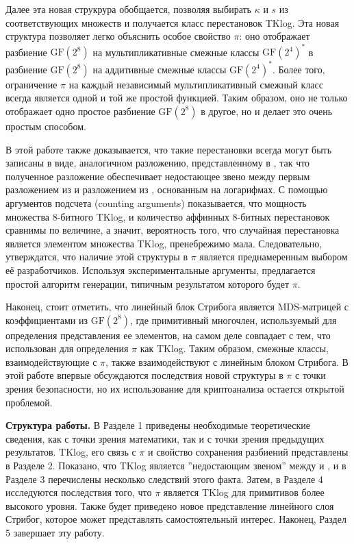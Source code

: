 Далее эта новая струкрура обобщается, позволяя выбирать \(\kappa\) и \(s\) из соответствующих множеств и получается класс перестановок TKlog. Эта новая структура позволяет легко объяснить особое свойство \(\pi\): оно отображает разбиение \(\text{GF}(2^8)\) на мультипликативные смежные классы \(\text{GF}(2^4)^*\) в разбиение \(\text{GF}(2^8)\) на аддитивные смежные классы \(\text{GF}(2^4)^*\). Более того, ограничение \(\pi\) на каждый независимый мультипликативный смежный класс всегда является одной и той же простой функцией. Таким образом, оно не только отображает одно простое разбиение \(\text{GF}(2^8)\) в другое, но и делает это очень простым способом.

В этой работе также доказывается, что такие перестановки всегда могут быть записаны в виде, аналогичном разложению, представленному в \cite{BPU16a}, так что полученное разложение обеспечивает недостающее звено между первым разложением из \cite{BPU16a} и разложением из \cite{PU16}, основанным на логарифмах. С помощью аргументов подсчета (counting arguments) показывается, что мощность множества 8-битного TKlog, и количество аффинных 8-битных перестановок сравнимы по величине, а значит, вероятность того, что случайная перестановка является элементом множества TKlog, пренебрежимо мала. Следовательно, утверждатся, что наличие этой структуры в \(\pi\) является преднамеренным выбором её разработчиков. Используя экспериментальные аргументы, предлагается простой алгоритм генерации, типичным результатом которого будет \(\pi\).

Наконец, стоит отметить, что линейный блок Стрибога является MDS-матрицей с коэффициентами из \(\text{GF}(2^8)\), где примитивный многочлен, используемый для определения представления ее элементов, на самом деле совпадает с тем, что использован для определения \(\pi\) как TKlog. Таким образом, смежные классы, взаимодействующие с \(\pi\), также взаимодействуют с линейным блоком Стрибога. В этой работе впервые обсуждаются последствия новой структуры в \(\pi\) с точки зрения безопасности, но их использование для криптоанализа остается открытой проблемой.

\textbf{Структура работы.} В Разделе 1 приведены необходимые теоретические сведения, как с точки зрения математики, так и с точки зрения предыдущих результатов. TKlog, его связь с \(\pi\) и свойство сохранения разбиений представлены в Разделе 2. Показано, что TKlog является ''недостающим звеном'' между \cite{BPU16a} и \cite{PU16}, и в Разделе 3 перечислены несколько следствий этого факта. Затем, в Разделе 4 исследуются последствия того, что \(\pi\) является TKlog для примитивов более высокого уровня. Также будет приведено новое представление линейного слоя Стрибог, которое может представлять самостоятельный интерес. Наконец, Раздел 5 завершает эту работу.
